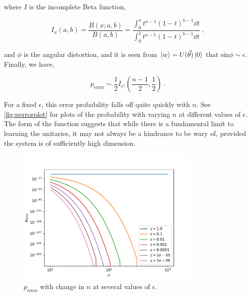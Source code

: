 where \(I\) is the incomplete Beta function, 

\begin{equation}
    I_x(a, b) = \frac{B(x; a, b)}{B(a, b)} = \frac{\int_0^x t^{a-1} (1-t)^{b-1} \dd t}{\int_0^1 t^{a-1} (1-t)^{b-1} \dd t}~,
\end{equation}

and \(\phi\) is the angular distortion, and it is seen from \(\ket*{w} =
U(\vec{\theta})\ket*{0}\) that \(\text{sin} \phi \sim \epsilon\). Finally, we
have,

\begin{equation}
    p_{\text{error}} \sim \frac{1}{2} I_{\epsilon^2}(\frac{n-1}{2}, \frac{1}{2})~.
\end{equation}

For a fixed \(\epsilon\), this error probability falls off quite quickly with
\(n\). See \autoref{fig:perrorplot} for plots of the probability with varying
\(n\) at different values of \(\epsilon\). The form of the function suggests
that while there is a fundamental limit to learning the unitaries, it may not
always be a hindrance to be wary of, provided the system is of sufficiently
high dimension.

\begin{figure}
    \centering
    \includegraphics[width=0.8\textwidth]{figures/perrorplot.pdf}
    \caption{\(p_{\text{error}}\) with change in \(n\) at several values of \(\epsilon\).}
    \label{fig:perrorplot}
\end{figure}
